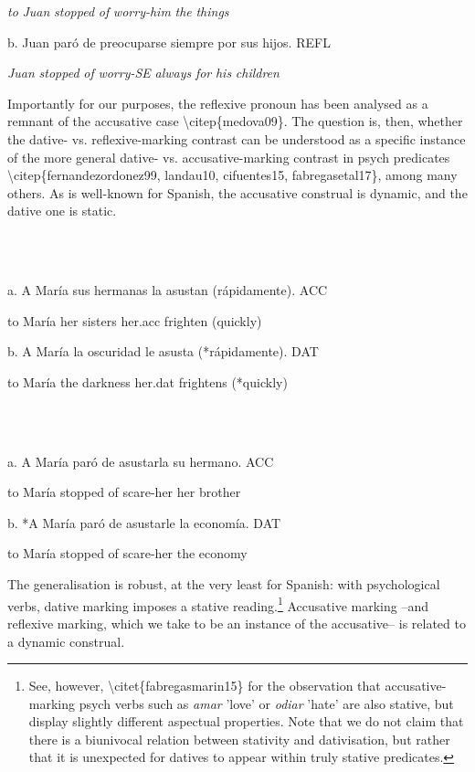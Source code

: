 \documentclass[output=paper,modfonts,nonflat]{langsci/langscibook}
\begin{document}
          \textit{to} \textit{Juan} \textit{stopped} \textit{of} \textit{worry-him}   \textit{the} \textit{things}

    b. Juan paró      de preocuparse siempre por sus hijos.            REFL

        \textit{Juan} \textit{stopped} \textit{of} \textit{worry-SE}    \textit{always}  \textit{for}  \textit{his} \textit{children}

Importantly for our purposes, the reflexive pronoun has been analysed as a remnant of the accusative case {\textbackslash}citep\{medova09\}. The question is, then, whether the dative- vs. reflexive-marking contrast can be understood as a specific instance of the more general dative- vs. accusative-marking contrast in psych predicates {\textbackslash}citep\{fernandezordonez99, landau10, cifuentes15, fabregasetal17\}, among many others. As is well-known for Spanish, the accusative construal is dynamic, and the dative one is static.

\ea%
    \label{ex:key:7}
    \gll\\
        \\
    \glt
    \z

          a.   A María sus hermanas   la       asustan (rápidamente).      ACC

          to María her sisters     her.acc   frighten (quickly)

    b. A María la oscuridad   le       asusta (*rápidamente).      DAT

          to María the darkness   her.dat   frightens (*quickly)

\ea%
    \label{ex:key:8}
    \gll\\
        \\
    \glt
    \z

          a.   A María paró     de asustarla su hermano.              ACC

          to María stopped of scare-her her brother

    b. *A María paró   de asustarle   la economía.            DAT

           to María stopped of scare-her   the economy  

The generalisation is robust, at the very least for Spanish: with psychological verbs, dative marking imposes a stative reading.\footnote{See, however, {\textbackslash}citet\{fabregasmarin15\} for the observation that accusative-marking psych verbs such as \textit{amar} 'love' or \textit{odiar} 'hate' are also stative, but display slightly different aspectual properties. Note that we do not claim that there is a biunivocal relation between stativity and dativisation, but rather that it is unexpected for datives to appear within truly stative predicates.} Accusative marking –and reflexive marking, which we take to be an instance of the accusative– is related to a dynamic construal. 
\end{document}
